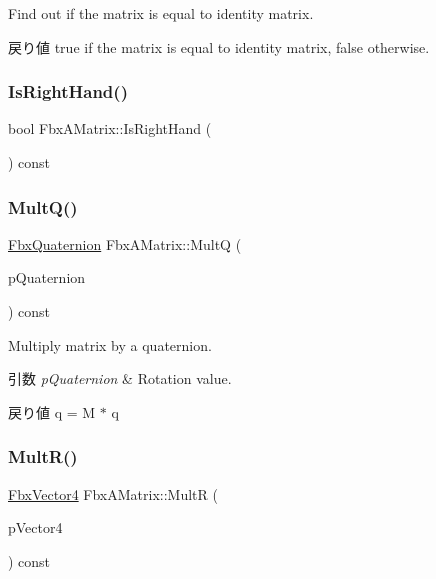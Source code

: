 Find out if the matrix is equal to identity matrix. \begin{DoxyReturn}{戻り値}
{\ttfamily true} if the matrix is equal to identity matrix, {\ttfamily false} otherwise. 
\end{DoxyReturn}
\mbox{\label{class_fbx_a_matrix_a9cdf7165572983d917a8e59577c3a55a}} 
\subsubsection{\texorpdfstring{Is\+Right\+Hand()}{IsRightHand()}}
{\footnotesize\ttfamily bool Fbx\+A\+Matrix\+::\+Is\+Right\+Hand (\begin{DoxyParamCaption}{ }\end{DoxyParamCaption}) const}

\mbox{\label{class_fbx_a_matrix_a92ea09bd97b85104bff21dde23edca35}} 
\subsubsection{\texorpdfstring{Mult\+Q()}{MultQ()}}
{\footnotesize\ttfamily \hyperlink{class_fbx_quaternion}{Fbx\+Quaternion} Fbx\+A\+Matrix\+::\+MultQ (\begin{DoxyParamCaption}\item[{const \hyperlink{class_fbx_quaternion}{Fbx\+Quaternion} \&}]{p\+Quaternion }\end{DoxyParamCaption}) const}

Multiply matrix by a quaternion. 
\begin{DoxyParams}{引数}
{\em p\+Quaternion} & Rotation value. \\
\hline
\end{DoxyParams}
\begin{DoxyReturn}{戻り値}
q\textquotesingle{} = M $\ast$ q 
\end{DoxyReturn}
\mbox{\label{class_fbx_a_matrix_a9fe3cfea0f753197bd116b429242eb09}} 
\subsubsection{\texorpdfstring{Mult\+R()}{MultR()}}
{\footnotesize\ttfamily \hyperlink{class_fbx_vector4}{Fbx\+Vector4} Fbx\+A\+Matrix\+::\+MultR (\begin{DoxyParamCaption}\item[{const \hyperlink{class_fbx_vector4}{Fbx\+Vector4} \&}]{p\+Vector4 }\end{DoxyParamCaption}) const}

